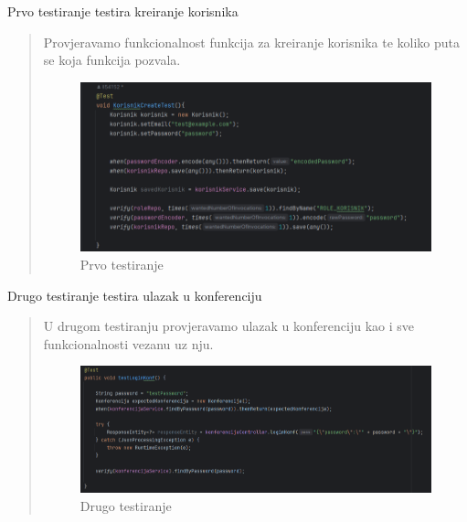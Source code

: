 			\begin{packed_enum}
				\item Prvo testiranje testira kreiranje korisnika
				
				\begin{quote}
						Provjeravamo funkcionalnost funkcija za kreiranje korisnika te koliko puta se koja funkcija pozvala.
						\begin{figure}[H]
							\includegraphics[width=\textwidth]{slike/JUnit1.png} %
							\caption{Prvo testiranje}
							\label{fig:JUnit1} %
						\end{figure}
				\end{quote}
				
				
				\item Drugo testiranje testira ulazak u konferenciju
				
				\begin{quote}
					U drugom testiranju provjeravamo ulazak u konferenciju kao i sve funkcionalnosti vezanu uz nju.
					\begin{figure}[H]
						\includegraphics[width=\textwidth]{slike/JUnit2.png} %
						\caption{Drugo testiranje}
						\label{fig:JUnit2} %
					\end{figure}
				\end{quote}
				

\end{packed_enum}

